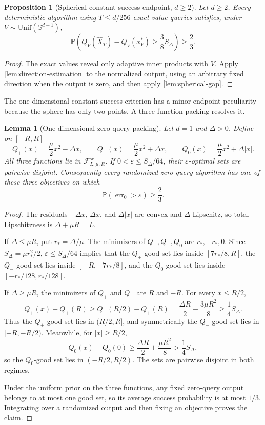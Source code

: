 \documentclass[11pt]{article}
\newcommand{\Pp}{\mathbb{P}}
\newcommand{\Sph}{\mathbb{S}}
\newcommand{\cF}{\mathcal{F}}
\newcommand{\eps}{\varepsilon}
\newcommand{\err}{\operatorname{err}}
\theoremstyle{plain}
\newtheorem{proposition}[proposition]{Proposition}
\newtheorem{lemma}[lemma]{Lemma}
\theoremstyle{definition}
\begin{document}
\begin{proposition}[Spherical constant-success endpoint, $d\ge2$]\label{prop:spherical-prob}
Let $d\ge2$.  Every deterministic algorithm using $T\le d/256$ exact-value queries satisfies, under $V\sim\mathrm{Unif}(\Sph^{d-1})$,
\begin{equation}\label{eq:spherical-prob-gap}
  \Pp\left(Q_V(\widehat X_T)-Q_V(x_V^*)\ge\frac38S_\Delta\right)
  \ge\frac23.
\end{equation}
\end{proposition}

\begin{proof}
The exact values reveal only adaptive inner products with $V$.  Apply \cref{lem:direction-estimation} to the normalized output, using an arbitrary fixed direction when the output is zero, and then apply \cref{lem:spherical-gap}.
\end{proof}

The one-dimensional constant-success criterion has a minor endpoint peculiarity because the sphere has only two points.  A three-function packing resolves it.

\begin{lemma}[One-dimensional zero-query packing]\label{lem:one-dimensional}
Let $d=1$ and $\Delta>0$.  Define on $[-R,R]$
\[
  Q_+(x)=\frac{\mu}{2}x^2-\Delta x,
  \qquad
  Q_-(x)=\frac{\mu}{2}x^2+\Delta x,
  \qquad
  Q_0(x)=\frac{\mu}{2}x^2+\Delta|x|.
\]
All three functions lie in $\cF^{\mathrm{sc}}_{L,\mu,R}$.  If $0<\eps\le S_\Delta/64$, their $\eps$-optimal sets are pairwise disjoint.  Consequently every randomized zero-query algorithm has one of these three objectives on which
\[
  \Pp(\err_0>\eps)\ge\frac23.
\]
\end{lemma}

\begin{proof}
The residuals $-\Delta x$, $\Delta x$, and $\Delta|x|$ are convex and $\Delta$-Lipschitz, so total Lipschitzness is $\Delta+\mu R=L$.

If $\Delta\le\mu R$, put $r_*=\Delta/\mu$.  The minimizers of $Q_+,Q_-,Q_0$ are $r_*,-r_*,0$.  Since $S_\Delta=\mu r_*^2/2$, $\eps\le S_\Delta/64$ implies that the $Q_+$-good set lies inside $[7r_*/8,R]$, the $Q_-$-good set lies inside $[-R,-7r_*/8]$, and the $Q_0$-good set lies inside $[-r_*/128,r_*/128]$.

If $\Delta\ge\mu R$, the minimizers of $Q_+$ and $Q_-$ are $R$ and $-R$.  For every $x\le R/2$,
\[
  Q_+(x)-Q_+(R)
  \ge Q_+(R/2)-Q_+(R)
  =\frac{\Delta R}{2}-\frac{3\mu R^2}{8}
  \ge\frac14S_\Delta.
\]
Thus the $Q_+$-good set lies in $(R/2,R]$, and symmetrically the $Q_-$-good set lies in $[-R,-R/2)$.  Meanwhile, for $|x|\ge R/2$,
\[
  Q_0(x)-Q_0(0)\ge\frac{\Delta R}{2}+\frac{\mu R^2}{8}>\frac14S_\Delta,
\]
so the $Q_0$-good set lies in $(-R/2,R/2)$.  The sets are pairwise disjoint in both regimes.

Under the uniform prior on the three functions, any fixed zero-query output belongs to at most one good set, so its average success probability is at most $1/3$.  Integrating over a randomized output and then fixing an objective proves the claim.
\end{proof}
\end{document}
